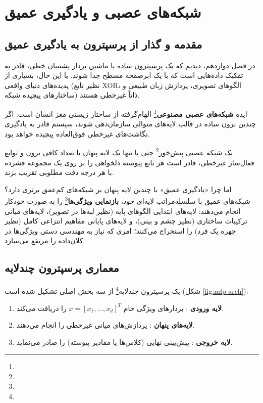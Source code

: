 \chapter{شبکه‌های عصبی و یادگیری عمیق \texorpdfstring{}{(Neural Networks \& Deep Learning)}}
\label{ch:neural-networks}

\section{مقدمه و گذار از پرسپترون به یادگیری عمیق}
در فصل دوازدهم، دیدیم که یک پرسپترون ساده یا ماشین بردار پشتیبان خطی، قادر به تفکیک داده‌هایی است که با یک ابرصفحه مسطح جدا شوند. با این حال، بسیاری از پدیده‌های دنیای واقعی (نظیر تابع XOR، الگوهای تصویری، پردازش زبان طبیعی و ساختارهای پیچیده شبکه) ذاتاً غیرخطی هستند.

ایده \textbf{شبکه‌های عصبی مصنوعی}\footnote{} الهام‌گرفته از ساختار زیستی مغز انسان است: اگر چندین نرون ساده در قالب لایه‌های متوالی سازمان‌دهی شوند، سیستم قادر به یادگیری نگاشت‌های غیرخطی فوق‌العاده پیچیده خواهد بود.

\begin{theorem}
یک شبکه عصبی پیش‌خور\footnote{} حتی با تنها یک لایه پنهان با تعداد کافی نرون و توابع فعال‌ساز غیرخطی، قادر است هر تابع پیوسته دلخواهی را بر روی یک مجموعه فشرده با هر درجه دقت مطلوبی تقریب بزند.
\end{theorem}

اما چرا «یادگیری عمیق» با چندین لایه پنهان بر شبکه‌های کم‌عمق برتری دارد؟ شبکه‌های عمیق با سلسله‌مراتب لایه‌ای خود، \textbf{بازنمایی ویژگی‌ها}\footnote{} را به صورت خودکار انجام می‌دهند: لایه‌های ابتدایی الگوهای پایه (نظیر لبه‌ها در تصویر)، لایه‌های میانی ترکیبات ساختاری (نظیر چشم و بینی)، و لایه‌های پایانی مفاهیم انتزاعی کامل (نظیر چهره یک فرد) را استخراج می‌کنند؛ امری که نیاز به مهندسی دستی ویژگی‌ها در کلان‌داده را مرتفع می‌سازد.

\section{معماری پرسپترون چندلایه \texorpdfstring{}{(MLP)}}
یک پرسپترون چندلایه\footnote{} از سه بخش اصلی تشکیل شده است (شکل \ref{fig:mlp-arch}):
\begin{enumerate}
    \item \textbf{لایه ورودی }: بردارهای ویژگی خام $x = [x_1, \dots, x_d]^T$ را دریافت می‌کند.
    \item \textbf{لایه‌های پنهان }: پردازش‌های میانی غیرخطی را انجام می‌دهند.
    \item \textbf{لایه خروجی }: پیش‌بینی نهایی (کلاس‌ها یا مقادیر پیوسته) را صادر می‌نماید.
\end{enumerate}

